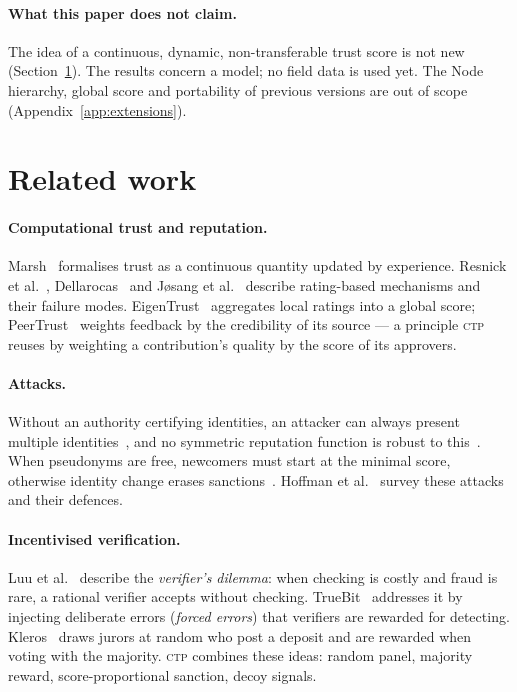 \documentclass[11pt,a4paper]{article}
\theoremstyle{plain}
\theoremstyle{definition}
\theoremstyle{remark}
\newcommand{\CTP}{\textsc{ctp}}
\newcommand{\1}{\mathbf{1}}
\begin{document}
\paragraph{What this paper does not claim.} The idea of a continuous, dynamic,
non-transferable trust score is not new (Section~\ref{sec:related}). The
results concern a model; no field data is used yet. The Node hierarchy, global
score and portability of previous versions are out of scope
(Appendix~\ref{app:extensions}).

\section{Related work}
\label{sec:related}

\paragraph{Computational trust and reputation.} Marsh~\cite{marsh1994}
formalises trust as a continuous quantity updated by experience. Resnick et
al.~\cite{resnick2000}, Dellarocas~\cite{dellarocas2003} and Jøsang et
al.~\cite{josang2007} describe rating-based mechanisms and their failure modes.
EigenTrust~\cite{kamvar2003} aggregates local ratings into a global score;
PeerTrust~\cite{xiong2004} weights feedback by the credibility of its source ---
a principle \CTP{} reuses by weighting a contribution's quality by the score of
its approvers.

\paragraph{Attacks.} Without an authority certifying identities, an attacker
can always present multiple identities~\cite{douceur2002}, and no symmetric
reputation function is robust to this~\cite{cheng2005}. When pseudonyms are
free, newcomers must start at the minimal score, otherwise identity change
erases sanctions~\cite{friedman2001}. Hoffman et al.~\cite{hoffman2009} survey
these attacks and their defences.

\paragraph{Incentivised verification.} Luu et al.~\cite{luu2015} describe the
\emph{verifier's dilemma}: when checking is costly and fraud is rare, a
rational verifier accepts without checking. TrueBit~\cite{teutsch2017}
addresses it by injecting deliberate errors (\emph{forced errors}) that
verifiers are rewarded for detecting. Kleros~\cite{kleros2019} draws jurors at
random who post a deposit and are rewarded when voting with the majority.
\CTP{} combines these ideas: random panel, majority reward, score-proportional
sanction, decoy signals.
\end{document}
